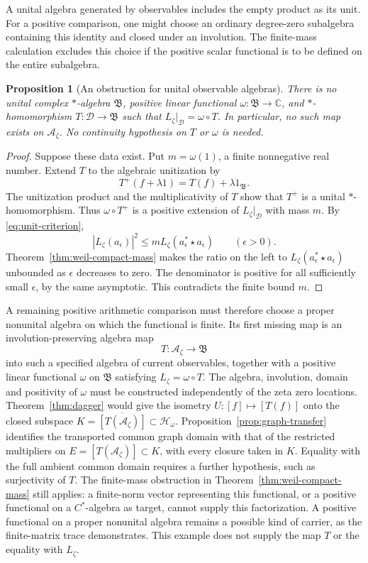\documentclass[11pt]{article}
\newtheorem{proposition}[theorem]{Proposition}
\theoremstyle{definition}
\theoremstyle{remark}
\numberwithin{equation}{section}
\newcommand{\cA}{\mathcal A}
\newcommand{\C}{\mathbb C}
\newcommand{\A}{\mathcal A}
\begin{document}
A unital algebra generated by observables includes the empty product as its unit.
For a positive comparison, one might choose an ordinary degree-zero
subalgebra containing this identity and closed under an involution.
The finite-mass calculation excludes this choice if the positive scalar
functional is to be defined on the entire subalgebra.

\begin{proposition}[An obstruction for unital observable algebras]
\label{prop:weil-unital-current}
There is no unital complex $*$-algebra $\mathfrak B$, positive linear
functional $\omega:\mathfrak B\to\C$, and $*$-homomorphism
$T:\mathscr D\to\mathfrak B$ such that $L_\zeta|_{\mathscr D}=\omega\circ T$.
In particular, no such map exists on $\cA_\zeta$.
No continuity hypothesis on $T$ or $\omega$ is needed.
\end{proposition}
\begin{proof}
Suppose these data exist.  Put $m=\omega(1)$, a finite nonnegative real
number.  Extend $T$ to the algebraic unitization by
\[
 T^+(f+\lambda1)=T(f)+\lambda1_{\mathfrak B}.
\]
The unitization product and the multiplicativity of $T$ show that $T^+$
is a unital $*$-homomorphism.
Thus $\omega\circ T^+$ is a positive extension of
$L_\zeta|_{\mathscr D}$ with mass $m$.
By \eqref{eq:unit-criterion},
\[
 |L_\zeta(a_\epsilon)|^2
       \leq m L_\zeta(a_\epsilon^*\star a_\epsilon)\qquad(\epsilon>0).
\]
Theorem~\ref{thm:weil-compact-mass} makes the ratio on the left to
$L_\zeta(a_\epsilon^*\star a_\epsilon)$ unbounded as $\epsilon$ decreases to zero.
The denominator is positive for all sufficiently small $\epsilon$, by the same
asymptotic.  This contradicts the finite bound $m$.
\end{proof}

A remaining positive arithmetic comparison must therefore choose a
proper nonunital algebra on which the functional is finite.
Its first missing map is an involution-preserving algebra map
\[
 T:\A_\zeta\longrightarrow\mathfrak B
\]
into such a specified algebra of current observables, together with a positive
linear functional $\omega$ on $\mathfrak B$ satisfying
$L_\zeta=\omega\circ T$.
The algebra, involution, domain and positivity of $\omega$ must be
constructed independently of the zeta zero locations.
Theorem~\ref{thm:dagger} would give the isometry
$U:[f]\mapsto[T(f)]$ onto the closed subspace
$K=\overline{[T(\A_\zeta)]}\subset\mathcal H_\omega$.
Proposition~\ref{prop:graph-transfer} identifies the transported common
graph domain with that of the restricted multipliers on
$E=[T(\A_\zeta)]\subset K$, with every closure taken in $K$.
Equality with the full ambient common domain requires a further
hypothesis, such as surjectivity of $T$.
The finite-mass obstruction in Theorem~\ref{thm:weil-compact-mass} still applies:
a finite-norm vector representing this functional, or a positive
functional on a $C^*$-algebra as target, cannot supply this factorization.
A positive functional on a proper nonunital algebra remains a possible
kind of carrier, as the finite-matrix trace demonstrates.  This example
does not supply the map $T$ or the equality with $L_\zeta$.
\end{document}
